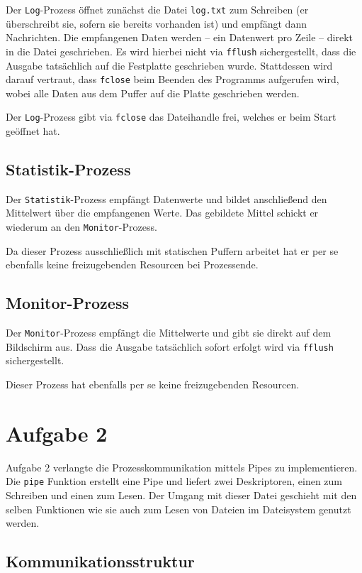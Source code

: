\documentclass[12pt, a4paper]{scrartcl}
\begin{document}
Der \texttt{Log}-Prozess öffnet zunächst die Datei \texttt{log.txt} zum
Schreiben (er überschreibt sie, sofern sie bereits vorhanden ist) und empfängt
dann Nachrichten. Die empfangenen Daten werden -- ein Datenwert pro Zeile --
direkt in die Datei geschrieben. Es wird hierbei nicht via \texttt{fflush}
sichergestellt, dass die Ausgabe tatsächlich auf die Festplatte geschrieben
wurde. Stattdessen wird darauf vertraut, dass \texttt{fclose} beim Beenden des
Programms aufgerufen wird, wobei alle Daten aus dem Puffer auf die Platte
geschrieben werden.
\np

Der \texttt{Log}-Prozess gibt via \texttt{fclose} das Dateihandle frei, welches
er beim Start geöffnet hat.

\subsection{Statistik-Prozess}

Der \texttt{Statistik}-Prozess empfängt Datenwerte und bildet anschließend
den Mittelwert über die empfangenen Werte. Das gebildete Mittel schickt er
wiederum an den \texttt{Monitor}-Prozess.
\np

Da dieser Prozess ausschließlich mit statischen Puffern arbeitet hat er per se
ebenfalls keine freizugebenden Resourcen bei Prozessende.

\subsection{Monitor-Prozess}

Der \texttt{Monitor}-Prozess empfängt die Mittelwerte und gibt sie direkt auf
dem Bildschirm aus. Dass die Ausgabe tatsächlich sofort erfolgt wird via
\texttt{fflush} sichergestellt.
\np

Dieser Prozess hat ebenfalls per se keine freizugebenden Resourcen.

\clearpage
\section{Aufgabe 2}

Aufgabe 2 verlangte die Prozesskommunikation mittels Pipes zu implementieren.
Die \texttt{pipe} Funktion erstellt eine Pipe und liefert zwei Deskriptoren,
einen zum Schreiben und einen zum Lesen. Der Umgang mit dieser Datei geschieht
mit den selben Funktionen wie sie auch zum Lesen von Dateien im Dateisystem
genutzt werden.

\subsection{Kommunikationsstruktur}
\end{document}
